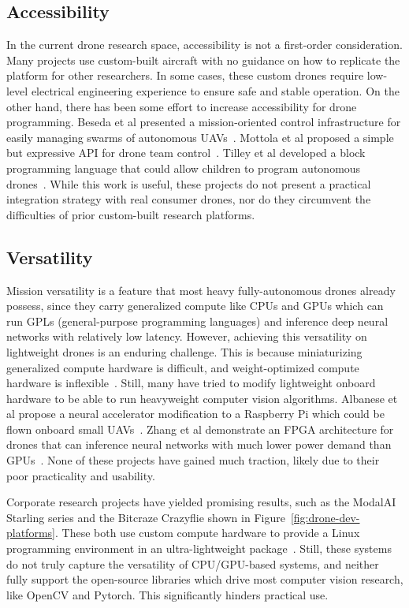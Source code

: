 \subsection{Accessibility}
\label{sec:development-platforms}
In the current drone research space, accessibility is not a first-order consideration. Many projects use custom-built aircraft with no guidance on how to replicate the platform for other researchers. In some cases, these custom drones require low-level electrical engineering experience to ensure safe and stable operation. On the other hand, there has been some effort to increase accessibility for drone programming. Beseda et al presented a mission-oriented control infrastructure for easily managing swarms of autonomous UAVs~\cite{Besada2019}. Mottola et al proposed a simple but expressive API for drone team control~\cite{Mottola2014}. Tilley et al developed a block programming language that could allow children to program autonomous drones~\cite{Tilley2017}. While this work is useful, these projects do not present a practical integration strategy with real consumer drones, nor do they circumvent the difficulties of prior custom-built research platforms.

\subsection{Versatility}
Mission versatility is a feature that most heavy fully-autonomous drones already possess, since they carry generalized compute like CPUs and GPUs which can run GPLs (general-purpose programming languages) and inference deep neural networks with relatively low latency. However, achieving this versatility on lightweight drones is an enduring challenge. This is because miniaturizing generalized compute hardware is difficult, and weight-optimized compute hardware is inflexible~\cite{Hu2022}. Still, many have tried to modify lightweight onboard hardware to be able to run heavyweight computer vision algorithms. Albanese et al propose a neural accelerator modification to a Raspberry Pi which could be flown onboard small UAVs~\cite{Albanese2022}. Zhang et al demonstrate an FPGA architecture for drones that can inference neural networks with much lower power demand than GPUs~\cite{Zhang2022}. None of these projects have gained much traction, likely due to their poor practicality and usability.

Corporate research projects have yielded promising results, such as the ModalAI Starling series and the Bitcraze Crazyflie shown in Figure~\ref{fig:drone-dev-platforms}. These both use custom compute hardware to provide a Linux programming environment in an ultra-lightweight package~\cite{Bitcraze, ModalAI}. Still, these systems do not truly capture the versatility of CPU/GPU-based systems, and neither fully support the open-source libraries which drive most computer vision research, like OpenCV and Pytorch. This significantly hinders practical use.

